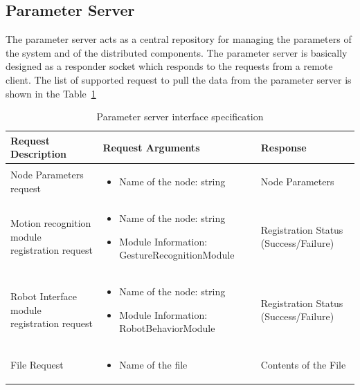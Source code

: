 \subsection*{Parameter Server} 
The parameter server acts as a central repository for managing the parameters of the system and of the distributed components. The parameter server is basically designed as a responder socket which responds to the requests from a remote client. The list of supported request to pull the data from the parameter server is shown in the Table~\ref{table:parameter_server}
\begin{table}[H]
\centering
\small
\caption{Parameter server interface specification}
\label{table:parameter_server}
\begin{tabular}{| p{3.1cm} | p{7.4cm} | p{2.8cm} |}
\hline
  \textbf{Request Description} & \textbf{Request Arguments} & \textbf{Response}
  \tabularnewline \hline
  Node Parameters request & \begin{itemize}[leftmargin=*,topsep={0pt},itemsep={0pt},partopsep={0pt},parsep={0pt}] 
                                                  \item Name of the node: string
                                                  \end{itemize} & Node Parameters 
                                          \tabularnewline\hline
                                          
  Motion recognition module registration request &  \begin{itemize}[leftmargin=*,topsep={0pt},itemsep={0pt},partopsep={0pt},parsep={0pt}] 
                                                  \item Name of the node: string
                                                  \item Module Information: GestureRecognitionModule
                                                \end{itemize} & Registration Status  (Success/Failure)
                                          \tabularnewline\hline
  
  Robot Interface module registration request & \begin{itemize}[leftmargin=*,topsep={0pt},itemsep={0pt},partopsep={0pt},parsep={0pt}] 
                                                \item Name of the node: string
                                                \item Module Information: RobotBehaviorModule 
                                            \end{itemize} & Registration Status  (Success/Failure)
                                          \tabularnewline\hline
  File Request & \begin{itemize}[leftmargin=*,topsep={0pt},itemsep={0pt},partopsep={0pt},parsep={0pt}] 
                                                  \item Name of the file
                                                  \end{itemize} & Contents of the File  
  										 \tabularnewline\hline
\end{tabular}
\end{table}
